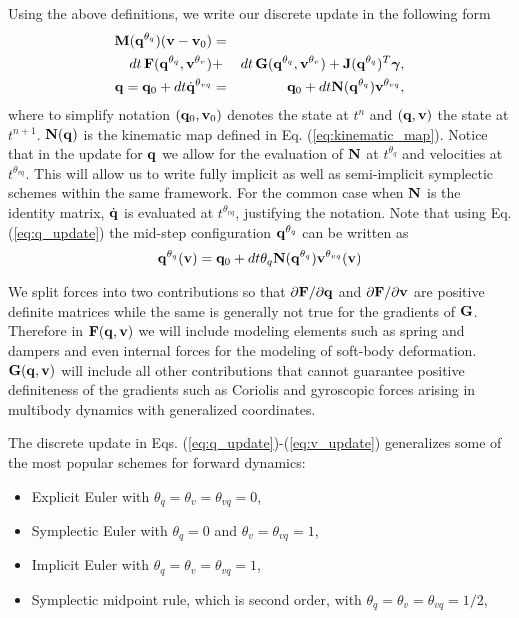 Using the above definitions, we write our discrete update in the following form
\begin{eqnarray}
	\mf{M}(\mf{q}^{\theta_{q}})(\mf{v}-\mf{v}_0)  &=& \nonumber\\
	dt\,\mf{F}(\mf{q}^{\theta_{q}}, \mf{v}^{\theta_v}) &+&
	dt\,\mf{G}(\mf{q}^{\theta_{q}}, \mf{v}^{\theta_v}) +
	\mf{J}(\mf{q}^{\theta_{q}})^T\mf{\bgamma}, \label{eq:v_update}\\
	\mf{q} = \mf{q}_0 + dt \dot{\mf{q}}^{\theta_{vq}} &=& \mf{q}_0 + dt\mf{N}(\mf{q}^{\theta_{q}})\mf{v}^{\theta_{vq}},
	\label{eq:q_update}
\end{eqnarray}
where to simplify notation $({\mathbf{q}}_0, {\mathbf{v}}_0)$ denotes the state at $t^n$ and
$({\mathbf{q}}, {\mathbf{v}})$ the state at $t^{n+1}$. ${\mathbf{N}}({\mathbf{q}})$ is the kinematic map
defined in Eq. (\ref{eq:kinematic_map}). Notice that in the update for ${\mathbf{q}}$
we allow for the evaluation of ${\mathbf{N}}$ at $t^{\theta_{q}}$ and velocities
at $t^{\theta_{vq}}$. This will allow us to write fully implicit as well as
semi-implicit symplectic schemes within the same framework. For the common case
when ${\mathbf{N}}$ is the identity matrix, $\dot{{\mathbf{q}}}$ is evaluated at
$t^{\theta_{vq}}$, justifying the notation. Note that using Eq.
(\ref{eq:q_update}) the mid-step configuration ${\mathbf{q}}^{\theta_q}$ can be
written as
\begin{equation}
	\mf{q}^{\theta_q}(\mf{v}) = \mf{q}_0 + dt\theta_q\mf{N}(\mf{q}^{\theta_{q}})\mf{v}^{\theta_{vq}}(\mf{v})
	\label{eq:position_update}
\end{equation}


We split forces into two contributions so that $\partial {\mathbf{F}}/\partial{\mathbf{q}}$ and $\partial {\mathbf{F}}/\partial{\mathbf{v}}$ are positive definite matrices while the same is generally not true for the gradients of ${\mathbf{G}}$. Therefore in ${\mathbf{F}}({\mathbf{q}}, {\mathbf{v}})$ we will include modeling elements such as spring and dampers and even internal forces
for the modeling of soft-body deformation. ${\mathbf{G}}({\mathbf{q}}, {\mathbf{v}})$ will include
all other contributions that cannot guarantee positive definiteness of the
gradients such as Coriolis and gyroscopic forces arising in multibody dynamics with generalized coordinates.

The discrete update in Eqs. (\ref{eq:q_update})-(\ref{eq:v_update}) generalizes
some of the most popular schemes for forward dynamics:
\begin{itemize}
	\item Explicit Euler with $\theta_q=\theta_{v}=\theta_{vq} = 0$,
	\item Symplectic Euler with $\theta_{q} = 0$ and $\theta_v = \theta_{vq}=1$,
	\item Implicit Euler with $\theta_{q} = \theta_v = \theta_{vq}= 1$,
	\item Symplectic midpoint rule, which is second order, with $\theta_{q} =
	\theta_v = \theta_{vq}= 1/2$,
\end{itemize}

